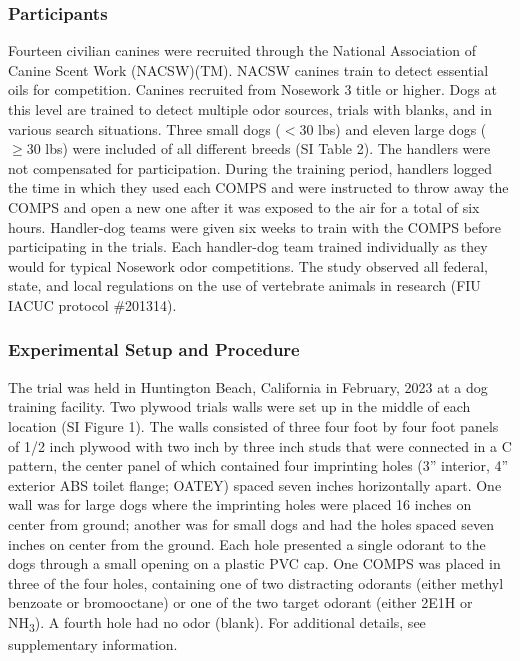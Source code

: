 \documentclass[
]{article}
\begin{document}
\hypertarget{participants}{%
\subsubsection{Participants}\label{participants}}

Fourteen civilian canines were recruited through the National Association of Canine Scent Work (NACSW)(TM). NACSW canines train to detect essential oils for competition. Canines recruited from Nosework 3 title or higher. Dogs at this level are trained to detect multiple odor sources, trials with blanks, and in various search situations. Three small dogs (\(< 30\) lbs) and eleven large dogs (\(\geq 30\) lbs) were included of all different breeds (SI Table 2). The handlers were not compensated for participation. During the training period, handlers logged the time in which they used each COMPS and were instructed to throw away the COMPS and open a new one after it was exposed to the air for a total of six hours. Handler-dog teams were given six weeks to train with the COMPS before participating in the trials. Each handler-dog team trained individually as they would for typical Nosework odor competitions. The study observed all federal, state, and local regulations on the use of vertebrate animals in research (FIU IACUC protocol \#201314).

\hypertarget{experimental-setup-and-procedure}{%
\subsubsection{Experimental Setup and Procedure}\label{experimental-setup-and-procedure}}

The trial was held in Huntington Beach, California in February, 2023 at a dog training facility. Two plywood trials walls were set up in the middle of each location (SI Figure 1). The walls consisted of three four foot by four foot panels of 1/2 inch plywood with two inch by three inch studs that were connected in a C pattern, the center panel of which contained four imprinting holes (3'' interior, 4'' exterior ABS toilet flange; OATEY) spaced seven inches horizontally apart. One wall was for large dogs where the imprinting holes were placed 16 inches on center from ground; another was for small dogs and had the holes spaced seven inches on center from the ground. Each hole presented a single odorant to the dogs through a small opening on a plastic PVC cap. One COMPS was placed in three of the four holes, containing one of two distracting odorants (either methyl benzoate or bromooctane) or one of the two target odorant (either 2E1H or NH\textsubscript{3}). A fourth hole had no odor (blank). For additional details, see supplementary information.
\end{document}
